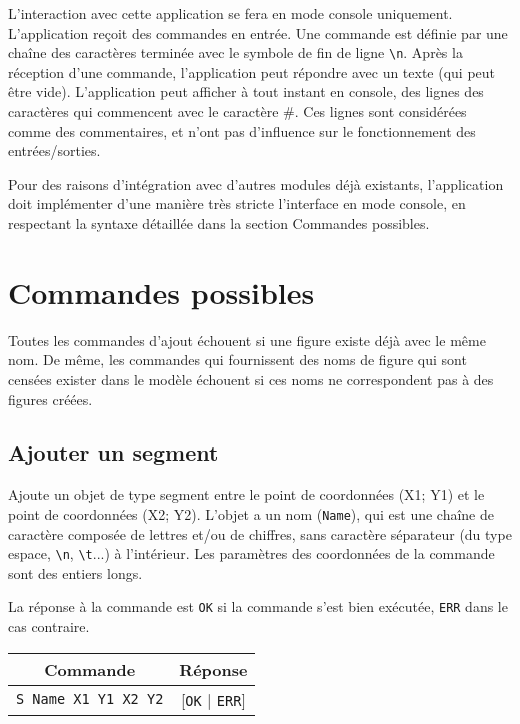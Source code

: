 \documentclass[11pt,a4paper]{article}
\begin{document}
	L'interaction avec cette application se fera en mode console uniquement. L'application reçoit des commandes en entrée. Une commande est définie par une chaîne des caractères terminée avec le symbole de fin de ligne \texttt{\textbackslash n}. Après la réception d'une commande, l'application peut répondre avec un texte (qui peut être vide). L'application peut afficher à tout instant en console, des lignes des caractères qui commencent avec le caractère \#. Ces lignes sont considérées comme des commentaires, et n'ont pas d'influence sur le fonctionnement des entrées/sorties.
	
	Pour des raisons d'intégration avec d'autres modules déjà existants, l’application doit implémenter d'une manière très stricte l'interface en mode console, en respectant la syntaxe détaillée dans la section Commandes possibles.
	
	\section{Commandes possibles}
	Toutes les commandes d'ajout échouent si une figure existe déjà avec le même nom. De même, les commandes qui fournissent des noms de figure qui sont censées exister dans le modèle échouent si ces noms ne correspondent pas à des figures créées.
	
	\subsection{Ajouter un segment}
	Ajoute un objet de type segment entre le point de coordonnées (X1; Y1) et le point de coordonnées (X2; Y2). L'objet a un nom (\texttt{Name}), qui est une chaîne de caractère composée de lettres et/ou de chiffres, sans caractère séparateur (du type espace, \texttt{\textbackslash n}, \texttt{\textbackslash t}...) à l'intérieur. Les paramètres des coordonnées de la commande sont des entiers longs.
	
	La réponse à la commande est \texttt{OK} si la commande s'est bien exécutée, \texttt{ERR} dans le cas contraire.
	
	\begin{center}
		\begin{tabular}[c]{|c | c|}
			\hline
			\textbf{Commande} & \textbf{Réponse} \\
			\hline
			\texttt{S Name X1 Y1 X2 Y2} & [\texttt{OK} | \texttt{ERR}] \\
			\hline
		\end{tabular}
	\end{center}
	
\end{document}
